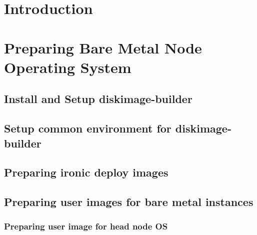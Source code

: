 \documentclass[letterpaper]{article}
\begin{document}
\graphicspath{{common/figures/}}
\thispagestyle{empty}


 

\newpage
\tableofcontents
\newpage


\section{Introduction} \label{sec:introduction}

 






\clearpage
\section{Preparing Bare Metal Node Operating System}\label{sec:baremetalprep}


\subsection{Install and Setup diskimage-builder}\label{sec:dib_install}


\subsection{Setup common environment for diskimage-builder}\label{sec:dib_environment}


\subsection{Preparing ironic deploy images}\label{sec:ironic_deploy_images}


\subsection{Preparing user images for bare metal instances}\label{sec:bare_metal_user_images}


\subsubsection{Preparing user image for head node OS}\label{sec:head_node_images}

\end{document}
